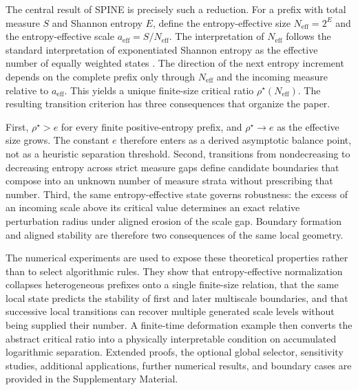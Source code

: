\documentclass[aip,cha,reprint,superscriptaddress,floatfix]{revtex4-2}
\theoremstyle{definition}
\theoremstyle{remark}
\newcommand{\Neff}{N_{\mathrm{eff}}}
\newcommand{\aeff}{a_{\mathrm{eff}}}
\newcommand{\rhostar}{\rho^{\star}}
\begin{document}

The central result of SPINE is precisely such a reduction. For a prefix with total measure \(S\) and Shannon entropy \(E\), define the entropy-effective size \(\Neff=2^E\) and the entropy-effective scale \(\aeff=S/\Neff\). The interpretation of \(\Neff\) follows the standard interpretation of exponentiated Shannon entropy as the effective number of equally weighted states \cite{hill1973,jost2006}. The direction of the next entropy increment depends on the complete prefix only through \(\Neff\) and the incoming measure relative to \(\aeff\). This yields a unique finite-size critical ratio \(\rhostar(\Neff)\). The resulting transition criterion has three consequences that organize the paper.

First, \(\rhostar>e\) for every finite positive-entropy prefix, and \(\rhostar\to e\) as the effective size grows. The constant \(e\) therefore enters as a derived asymptotic balance point, not as a heuristic separation threshold. Second, transitions from nondecreasing to decreasing entropy across strict measure gaps define candidate boundaries that compose into an unknown number of measure strata without prescribing that number. Third, the same entropy-effective state governs robustness: the excess of an incoming scale above its critical value determines an exact relative perturbation radius under aligned erosion of the scale gap. Boundary formation and aligned stability are therefore two consequences of the same local geometry.

The numerical experiments are used to expose these theoretical properties rather than to select algorithmic rules. They show that entropy-effective normalization collapses heterogeneous prefixes onto a single finite-size relation, that the same local state predicts the stability of first and later multiscale boundaries, and that successive local transitions can recover multiple generated scale levels without being supplied their number. A finite-time deformation example then converts the abstract critical ratio into a physically interpretable condition on accumulated logarithmic separation. Extended proofs, the optional global selector, sensitivity studies, additional applications, further numerical results, and boundary cases are provided in the Supplementary Material.
\end{document}
